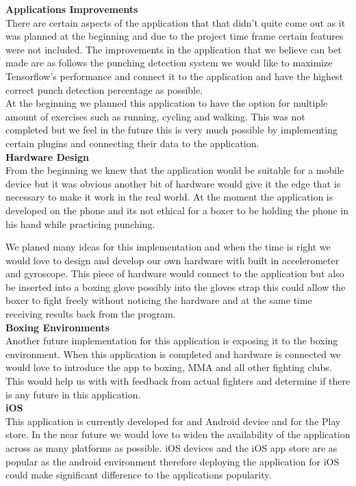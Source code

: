\documentclass[a4paper,12pt]{report}
\begin{document}
\textbf{Applications Improvements}\\
There are certain aspects of the application that that didn't quite come out as it was planned at the beginning and due to the project time frame certain features were not included.
The improvements in the application that we believe can bet made are as follows the punching detection system we would like to maximize Tensorflow's performance and connect it to the application and have the highest correct punch detection percentage as possible.\\
At the beginning we planned this application to have the option for multiple amount of exercises such as running, cycling and walking. This was not completed but we feel in the future this is very much possible by implementing certain plugins and connecting their data to the application.\\  


\textbf{Hardware Design}\\
From the beginning we knew that the application would be suitable for a mobile device but it was obvious another bit of hardware would give it the edge that is necessary to make it work in the real world.
At the moment the application is developed on the phone and its not ethical for a boxer to be holding the phone in his hand while practicing punching.

We planed many ideas for this implementation and when the time is right we would love to design and develop our own hardware with built in accelerometer and gyroscope.
This piece of hardware would connect to the application but also be inserted into a boxing glove possibly into the gloves strap this could allow the boxer to fight freely without noticing the hardware and at the same time receiving results back from the program.\\

\textbf{Boxing Environments}\\
Another future implementation for this application is exposing it to the boxing environment. When this application is completed and hardware is connected we would love to introduce the app to boxing, MMA and all other fighting clubs.
This would help us with with feedback from actual fighters and determine if there is any future in this application.\\

\textbf{iOS}\\
This application is currently developed for and Android device and for the Play store. In the near future we would love to widen the availability of the application across as many platforms as possible.
iOS devices and the iOS app store are as popular as the android environment therefore deploying the application for iOS could make significant difference to the applications popularity.\\





\end{document}
